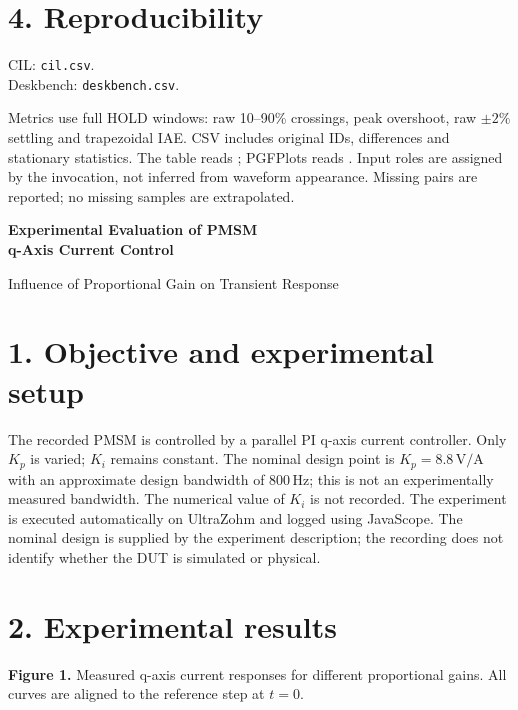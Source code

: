 \documentclass[a4paper,11pt]{article}
\begin{document}
\section*{4. Reproducibility}
CIL: \texttt{cil.csv}.\\ Deskbench: \texttt{deskbench.csv}.

Metrics use full HOLD windows: raw 10--90\% crossings, peak overshoot, raw
$\pm2\%$ settling and trapezoidal IAE. CSV includes original IDs, differences and
stationary statistics. The table reads ;
PGFPlots reads . Input roles are assigned by
the invocation, not inferred from waveform appearance. Missing pairs are reported;
no missing samples are extrapolated.

\else
\begin{center}
{\Large\bfseries Experimental Evaluation of PMSM\\q-Axis Current Control}\par
\smallskip
{\large Influence of Proportional Gain on Transient Response}
\end{center}

\section*{1. Objective and experimental setup}
The recorded PMSM is controlled by a parallel PI
q-axis current controller. Only $K_p$ is varied; $K_i$ remains constant. The nominal
design point is $K_p=8.8\,\mathrm{V/A}$ with an approximate design bandwidth of
$800\,\mathrm{Hz}$; this is not an experimentally measured bandwidth. The numerical
value of $K_i$ is not recorded. The experiment is executed automatically on
UltraZohm and logged using JavaScope. The nominal design is supplied by the experiment description; the recording
does not identify whether the DUT is simulated or physical.


\section*{2. Experimental results}
\begin{center}
\end{center}
\vspace{3mm}
{\small\textbf{Figure 1.} Measured q-axis current responses for different proportional
gains. All curves are aligned to the reference step at $t=0$.}
\end{document}
